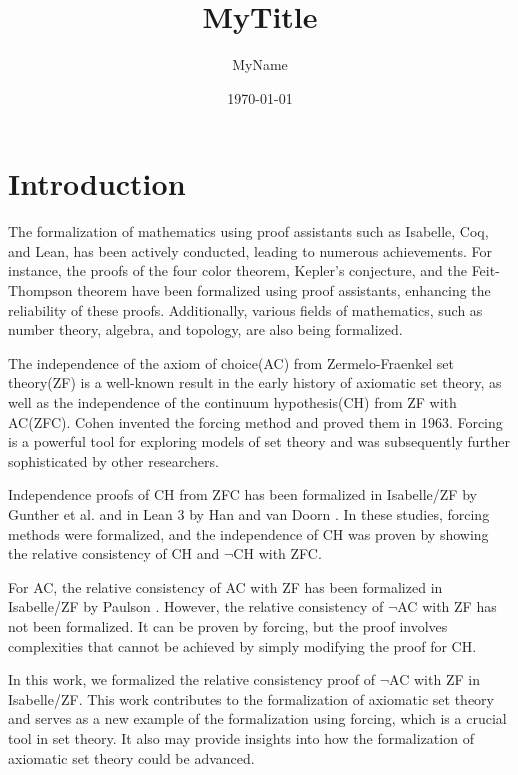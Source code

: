 \documentclass{report}
\begin{document}
\title{MyTitle}
\author{MyName}
\date{\today}
\maketitle


\clearpage
\tableofcontents
\clearpage
\chapter{Introduction}

The formalization of mathematics using proof assistants such as Isabelle\cite{paulson_1986}, Coq, and Lean, has been actively conducted, leading to numerous achievements. 
For instance, the proofs of the four color theorem, Kepler's conjecture, and the Feit-Thompson theorem have been formalized using proof assistants, enhancing the reliability of these proofs. 
Additionally, various fields of mathematics, such as number theory, algebra, and topology, are also being formalized.

The independence of the axiom of choice(AC) from Zermelo-Fraenkel set theory(ZF) is a well-known result in the early history of axiomatic set theory,
as well as the independence of the continuum hypothesis(CH) from ZF with AC(ZFC).
Cohen invented the forcing method and proved them in 1963.
Forcing is a powerful tool for exploring models of set theory and was subsequently further sophisticated by other researchers.

Independence proofs of CH from ZFC has been formalized in Isabelle/ZF by Gunther et al. \cite{gunther_independence} and in Lean 3 by Han and van Doorn \cite{flypitch}.
In these studies, forcing methods were formalized, and the independence of CH was proven by 
showing the relative consistency of CH and $\neg$CH with ZFC.

For AC, the relative consistency of AC with ZF has been formalized in Isabelle/ZF by Paulson \cite{paulson_AC_consistency}.
However, the relative consistency of $\neg$AC with ZF has not been formalized.
It can be proven by forcing, but the proof involves complexities that cannot be achieved by simply modifying the proof for CH.

In this work, we formalized the relative consistency proof of $\neg$AC with ZF in Isabelle/ZF. 
This work contributes to the formalization of axiomatic set theory and 
serves as a new example of the formalization using forcing, which is a crucial tool in set theory.
It also may provide insights into how the formalization of axiomatic set theory could be advanced.
\end{document}
